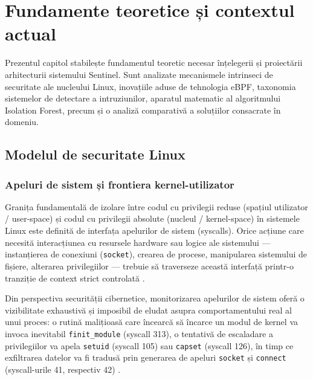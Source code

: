 \chapter{Fundamente teoretice și contextul actual}
\label{chap:ch2}

\par Prezentul capitol stabilește fundamentul teoretic necesar înțelegerii și proiectării arhitecturii sistemului Sentinel. Sunt analizate mecanismele intrinseci de securitate ale nucleului Linux, inovațiile aduse de tehnologia eBPF, taxonomia sistemelor de detectare a intruziunilor, aparatul matematic al algoritmului Isolation Forest, precum și o analiză comparativă a soluțiilor consacrate în domeniu.


\section{Modelul de securitate Linux}
\label{sec:linux_security}

\subsection{Apeluri de sistem și frontiera kernel-utilizator}
\label{subsec:syscalls}

\par Granița fundamentală de izolare între codul cu privilegii reduse (spațiul utilizator / user-space) și codul cu privilegii absolute (nucleul / kernel-space) în sistemele Linux este definită de interfața apelurilor de sistem (syscalls). Orice acțiune care necesită interacțiunea cu resursele hardware sau logice ale sistemului --- instanțierea de conexiuni (\texttt{socket}), crearea de procese, manipularea sistemului de fișiere, alterarea privilegiilor --- trebuie să traverseze această interfață printr-o tranziție de context strict controlată \cite{Kerrisk2010}.

\par Din perspectiva securității cibernetice, monitorizarea apelurilor de sistem oferă o vizibilitate exhaustivă și imposibil de eludat asupra comportamentului real al unui proces: o rutină malițioasă care încearcă să încarce un modul de kernel va invoca inevitabil \texttt{finit\_module} (syscall 313), o tentativă de escaladare a privilegiilor va apela \texttt{setuid} (syscall 105) sau \texttt{capset} (syscall 126), în timp ce exfiltrarea datelor va fi tradusă prin generarea de apeluri \texttt{socket} și \texttt{connect} (syscall-urile 41, respectiv 42) \cite{Love2010}.

